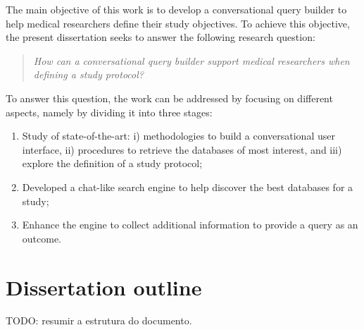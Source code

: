 The main objective of this work is to develop a conversational query builder to help medical researchers define their study objectives. To achieve this objective, the present dissertation seeks to answer the following research question:

\begin{quote}
    \small\textit{How can a conversational query builder support medical researchers when defining a study protocol?}
\end{quote}

To answer this question, the work can be addressed by focusing on different aspects, namely by dividing it into three stages:


\begin{enumerate}
    \item Study of state-of-the-art: i) methodologies to build a conversational user interface, ii) procedures to retrieve the databases of most interest, and iii) explore the definition of a study protocol;
    \item Developed a chat-like search engine to help discover the best databases for a study;
    \item Enhance the engine to collect additional information to provide a query as an outcome. 
\end{enumerate}


\section{Dissertation outline}

TODO: resumir a estrutura do documento.
